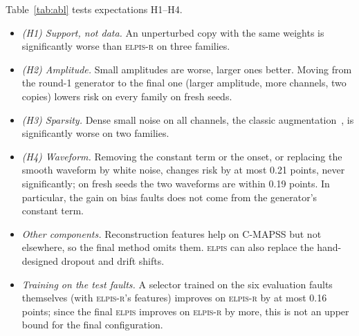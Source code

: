 \documentclass{esannV2}
\newcommand{\RPT}{\textsc{elpis}}
\newcommand{\Rone}{\textsc{elpis-r}}
\begin{document}
Table~\ref{tab:abl} tests expectations H1--H4.
\begin{itemize}
\item \emph{(H1) Support, not data.} An unperturbed copy with the same weights is significantly worse than \Rone{} on three families.
\item \emph{(H2) Amplitude.} Small amplitudes are worse, larger ones better. Moving from the round-1 generator to the final one (larger amplitude, more channels, two copies) lowers risk on every family on fresh seeds.
\item \emph{(H3) Sparsity.} Dense small noise on all channels, the classic augmentation~\cite{bishop1995training}, is significantly worse on two families.
\item \emph{(H4) Waveform.} Removing the constant term or the onset, or replacing the smooth waveform by white noise, changes risk by at most 0.21 points, never significantly; on fresh seeds the two waveforms are within 0.19 points. In particular, the gain on bias faults does not come from the generator's constant term.
\item \emph{Other components.} Reconstruction features help on C-MAPSS but not elsewhere, so the final method omits them. \RPT{} can also replace the hand-designed dropout and drift shifts.
\item \emph{Training on the test faults.} A selector trained on the six evaluation faults themselves (with \Rone's features) improves on \Rone{} by at most 0.16 points; since the final \RPT{} improves on \Rone{} by more, this is not an upper bound for the final configuration.
\end{itemize}
\end{document}
